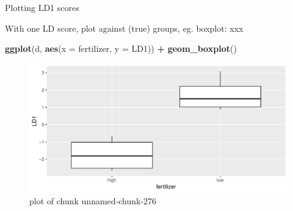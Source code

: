 \documentclass[ignorenonframetext,]{beamer}
\newenvironment{Shaded}{\begin{snugshade}}{\end{snugshade}}
\newcommand{\DataTypeTok}[1]{\textcolor[rgb]{0.13,0.29,0.53}{#1}}
\newcommand{\KeywordTok}[1]{\textcolor[rgb]{0.13,0.29,0.53}{\textbf{#1}}}
\newcommand{\NormalTok}[1]{#1}
\newcommand{\OperatorTok}[1]{\textcolor[rgb]{0.81,0.36,0.00}{\textbf{#1}}}
\newcommand{\StringTok}[1]{\textcolor[rgb]{0.31,0.60,0.02}{#1}}
\begin{document}
\begin{frame}[fragile]{Plotting LD1 scores}
\protect\hypertarget{plotting-ld1-scores}{}

With one LD score, plot against (true) groups, eg. boxplot: xxx

\begin{Shaded}
\begin{Highlighting}[]
\KeywordTok{ggplot}\NormalTok{(d, }\KeywordTok{aes}\NormalTok{(}\DataTypeTok{x =}\NormalTok{ fertilizer, }\DataTypeTok{y =}\NormalTok{ LD1)) }\OperatorTok{+}\StringTok{ }\KeywordTok{geom_boxplot}\NormalTok{()}
\end{Highlighting}
\end{Shaded}

\begin{figure}
\centering
\includegraphics{figure/unnamed-chunk-276-1.pdf}
\caption{plot of chunk unnamed-chunk-276}
\end{figure}

\end{frame}
\end{document}
